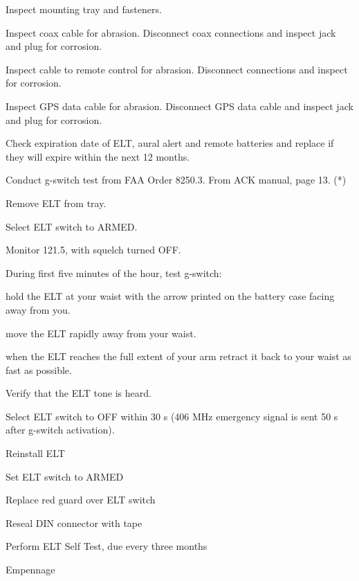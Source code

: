 \begin{enumerate*}
\begin{enumerate*}
  	\item Inspect mounting tray and fasteners. 
  	\item Inspect coax cable for abrasion. Disconnect coax connections and inspect jack and plug for corrosion. 
  	\item Inspect cable to remote control for abrasion. Disconnect connections and inspect for corrosion. 
  	\item Inspect GPS data cable for abrasion. Disconnect GPS data cable and inspect jack and plug for corrosion.
  	\item Check expiration date of ELT, aural alert and remote batteries and replace if they will expire within the next 12 months. 
  	\item Conduct g-switch test from FAA Order 8250.3. From ACK manual, page 13. (*)
  	\begin{enumerate*}
  		\item Remove ELT from tray. 
  		\item Select ELT switch to ARMED. 
  		\item Monitor 121.5, with squelch turned OFF. 
  		\item During first five minutes of the hour, test g-switch: 
  		\begin{enumerate*}
  		  \item hold the ELT at your waist with the arrow printed on the battery case facing away from you. 
  		  \item move the ELT rapidly away from your waist. 
  		  \item when the ELT reaches the full extent of your arm retract it back to your waist as fast as possible.
  		  \end{enumerate*} 
  		\item Verify that the ELT tone is heard. 
  		\item Select ELT switch to OFF within 30 s (406 MHz emergency signal is sent 50 s after g-switch activation). 
  	\end{enumerate*}
  	\item Reinstall ELT
  	\item Set ELT switch to ARMED
  	\item Replace red guard over ELT switch
  	\item Reseal DIN connector with tape
  	\item Perform ELT Self Test, due every three months
  \end{enumerate*}
	\item{Empennage} 
	\begin{enumerate*}

\end{enumerate*}
\end{enumerate*}
